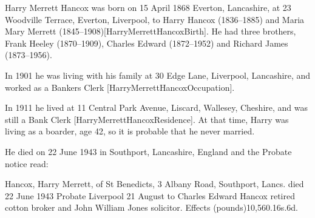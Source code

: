 
Harry Merrett Hancox was born on 15 April 1868 	Everton, Lancashire, at 23 Woodville Terrace, Everton, Liverpool, to Harry Hancox (1836--1885) and Maria Mary Merrett (1845--1908)[HarryMerrettHancoxBirth].  He had three brothers, Frank Heeley (1870--1909), Charles Edward (1872--1952) and Richard James (1873--1956).

In 1901 he was living with his family at 30 Edge Lane, Liverpool, Lancashire, and worked as a Bankers Clerk [HarryMerrettHancoxOccupation].

In 1911 he lived at 11 Central Park Avenue, Liscard, Wallesey, Cheshire, and was still a Bank Clerk [HarryMerrettHancoxResidence]. At that time, Harry was living as a boarder, age 42, so it is probable that he never married. 

He died on 22 June 1943 in Southport, Lancashire, England\cite{HarryMerrettHancoxDeath} and the Probate notice read:

Hancox, Harry Merrett, of St Benedicts, 3 Albany Road, Southport, Lancs. died 22 June 1943 Probate Liverpool 21 August to Charles Edward Hancox retired cotton broker and John William Jones solicitor. Effects (pounds)10,560.16s.6d.


